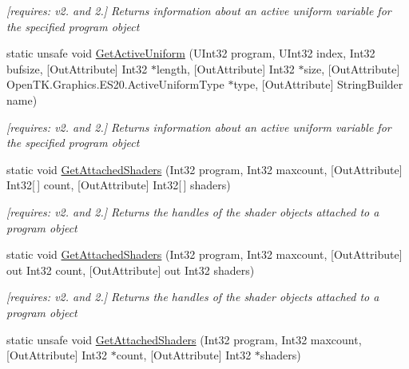 \begin{DoxyCompactItemize}
\begin{DoxyCompactList}\small\item\em \mbox{[}requires\-: v2. and 2.\mbox{]} Returns information about an active uniform variable for the specified program object \end{DoxyCompactList}\item 
static unsafe void \hyperlink{class_open_t_k_1_1_graphics_1_1_e_s20_1_1_g_l_aea8c17eccce981a1b750fd32d2860443}{Get\-Active\-Uniform} (U\-Int32 program, U\-Int32 index, Int32 bufsize, \mbox{[}Out\-Attribute\mbox{]} Int32 $\ast$length, \mbox{[}Out\-Attribute\mbox{]} Int32 $\ast$size, \mbox{[}Out\-Attribute\mbox{]} Open\-T\-K.\-Graphics.\-E\-S20.\-Active\-Uniform\-Type $\ast$type, \mbox{[}Out\-Attribute\mbox{]} String\-Builder name)
\begin{DoxyCompactList}\small\item\em \mbox{[}requires\-: v2. and 2.\mbox{]} Returns information about an active uniform variable for the specified program object \end{DoxyCompactList}\item 
static void \hyperlink{class_open_t_k_1_1_graphics_1_1_e_s20_1_1_g_l_aef9fa88b5252c4532aefbda6986e94c7}{Get\-Attached\-Shaders} (Int32 program, Int32 maxcount, \mbox{[}Out\-Attribute\mbox{]} Int32\mbox{[}$\,$\mbox{]} count, \mbox{[}Out\-Attribute\mbox{]} Int32\mbox{[}$\,$\mbox{]} shaders)
\begin{DoxyCompactList}\small\item\em \mbox{[}requires\-: v2. and 2.\mbox{]} Returns the handles of the shader objects attached to a program object \end{DoxyCompactList}\item 
static void \hyperlink{class_open_t_k_1_1_graphics_1_1_e_s20_1_1_g_l_a8137bf1c29a38a96d1730e2dc257b97c}{Get\-Attached\-Shaders} (Int32 program, Int32 maxcount, \mbox{[}Out\-Attribute\mbox{]} out Int32 count, \mbox{[}Out\-Attribute\mbox{]} out Int32 shaders)
\begin{DoxyCompactList}\small\item\em \mbox{[}requires\-: v2. and 2.\mbox{]} Returns the handles of the shader objects attached to a program object \end{DoxyCompactList}\item 
static unsafe void \hyperlink{class_open_t_k_1_1_graphics_1_1_e_s20_1_1_g_l_a57edc47aadd3c77e6bbc8cc082affc26}{Get\-Attached\-Shaders} (Int32 program, Int32 maxcount, \mbox{[}Out\-Attribute\mbox{]} Int32 $\ast$count, \mbox{[}Out\-Attribute\mbox{]} Int32 $\ast$shaders)

\end{DoxyCompactItemize}

